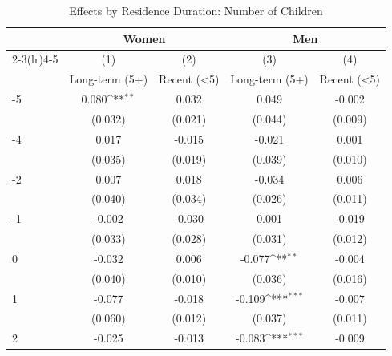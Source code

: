 \begin{table}[htbp]\centering
\def\sym#1{\ifmmode^{#1}\else\(^{#1}\)\fi}
\caption{Effects by Residence Duration: Number of Children}
\begin{tabular}{l*{4}{c}}
\hline\hline
            &\multicolumn{2}{c}{Women}                  &\multicolumn{2}{c}{Men}                    \\\cmidrule(lr){2-3}\cmidrule(lr){4-5}
            &\multicolumn{1}{c}{(1)}&\multicolumn{1}{c}{(2)}&\multicolumn{1}{c}{(3)}&\multicolumn{1}{c}{(4)}\\
            &\multicolumn{1}{c}{Long-term (5+)}&\multicolumn{1}{c}{Recent (<5)}&\multicolumn{1}{c}{Long-term (5+)}&\multicolumn{1}{c}{Recent (<5)}\\
\hline
-5          &       0.080\sym{**} &       0.032         &       0.049         &      -0.002         \\
            &     (0.032)         &     (0.021)         &     (0.044)         &     (0.009)         \\
[1em]
-4          &       0.017         &      -0.015         &      -0.021         &       0.001         \\
            &     (0.035)         &     (0.019)         &     (0.039)         &     (0.010)         \\
[1em]
-2          &       0.007         &       0.018         &      -0.034         &       0.006         \\
            &     (0.040)         &     (0.034)         &     (0.026)         &     (0.011)         \\
[1em]
-1          &      -0.002         &      -0.030         &       0.001         &      -0.019         \\
            &     (0.033)         &     (0.028)         &     (0.031)         &     (0.012)         \\
[1em]
0           &      -0.032         &       0.006         &      -0.077\sym{**} &      -0.004         \\
            &     (0.040)         &     (0.010)         &     (0.036)         &     (0.016)         \\
[1em]
1           &      -0.077         &      -0.018         &      -0.109\sym{***}&      -0.007         \\
            &     (0.060)         &     (0.012)         &     (0.037)         &     (0.011)         \\
[1em]
2           &      -0.025         &      -0.013         &      -0.083\sym{***}&      -0.009         \\

\end{tabular}
\end{table}
